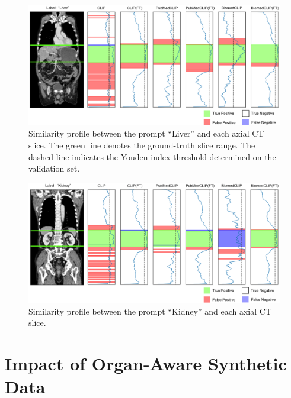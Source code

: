 \documentclass[bioengineering,article,submit,pdftex,moreauthors]{Definitions/mdpi}
\begin{document}
\begin{figure}[ht]
  \centering
  \includegraphics[width=1\textwidth]{./figures/app_organ_aware_liver_2.png}
  \caption{Similarity profile between the prompt “Liver” and each axial CT slice. 
  The green line denotes the ground-truth slice range. 
  The dashed line indicates the Youden-index threshold determined on the validation set.}
  \label{fig:organ_aware_liver}
\end{figure}


\begin{figure}[ht]
  \centering
  \includegraphics[width=1\textwidth]{./figures/app_organ_aware_kidney_2.png}
  \caption{Similarity profile between the prompt “Kidney” and each axial CT slice.}
  \label{fig:organ_aware_kidney}
\end{figure}

\clearpage

\section{Impact of Organ-Aware Synthetic Data}\label{app:impact}
\end{document}
